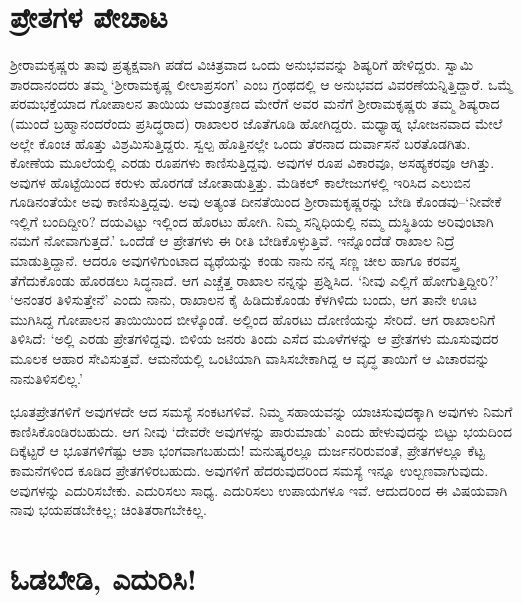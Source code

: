 \section*{ಪ್ರೇತಗಳ ಪೇಚಾಟ}


ಶ‍್ರೀರಾಮಕೃಷ್ಣರು ತಾವು ಪ್ರತ್ಯಕ್ಷವಾಗಿ ಪಡೆದ ವಿಚಿತ್ರವಾದ ಒಂದು ಅನುಭವವನ್ನು ಶಿಷ್ಯರಿಗೆ ಹೇಳಿದ್ದರು. ಸ್ವಾಮಿ ಶಾರದಾನಂದರು ತಮ್ಮ ‘ಶ‍್ರೀರಾಮಕೃಷ್ಣ ಲೀಲಾಪ್ರಸಂಗ’ ಎಂಬ ಗ್ರಂಥದಲ್ಲಿ ಆ ಅನುಭವದ ವಿವರಣೆಯನ್ನಿತ್ತಿದ್ದಾರೆ. ಒಮ್ಮೆ ಪರಮಭಕ್ತೆಯಾದ ಗೋಪಾಲನ ತಾಯಿಯ ಆಮಂತ್ರಣದ ಮೇರೆಗೆ ಅವರ ಮನೆಗೆ ಶ‍್ರೀರಾಮಕೃಷ್ಣರು ತಮ್ಮ ಶಿಷ್ಯರಾದ (ಮುಂದೆ ಬ್ರಹ್ಮಾನಂದರೆಂದು ಪ್ರಸಿದ್ಧರಾದ) ರಾಖಾಲರ ಜೊತೆಗೂಡಿ ಹೋಗಿದ್ದರು. ಮಧ್ಯಾಹ್ನ ಭೋಜನವಾದ ಮೇಲೆ ಅಲ್ಲೇ ಕೊಂಚ ಹೊತ್ತು ವಿಶ್ರಮಿಸುತ್ತಿದ್ದರು. ಸ್ವಲ್ಪ ಹೊತ್ತಿನಲ್ಲೇ ಒಂದು ತೆರನಾದ ದುರ್ವಾಸನೆ ಬರತೊಡಗಿತು. ಕೋಣೆಯ ಮೂಲೆಯಲ್ಲಿ ಎರಡು ರೂಪಗಳು ಕಾಣಿಸುತ್ತಿದ್ದವು. ಅವುಗಳ ರೂಪ ವಿಕಾರವೂ, ಅಸಹ್ಯಕರವೂ ಆಗಿತ್ತು. ಅವುಗಳ ಹೊಟ್ಟೆಯಿಂದ ಕರುಳು ಹೊರಗಡೆ ಜೋತಾಡುತ್ತಿತ್ತು. ಮೆಡಿಕಲ್ ಕಾಲೇಜುಗಳಲ್ಲಿ ಇರಿಸಿದ ಎಲುಬಿನ ಗೂಡಿನಂತೆಯೇ ಅವು ಕಾಣಿಸುತ್ತಿದ್ದವು. ಅವು ಅತ್ಯಂತ ದೀನತೆಯಿಂದ ಶ‍್ರೀರಾಮಕೃಷ್ಣರನ್ನು ಬೇಡಿ ಕೊಂಡವು–‘ನೀವೇಕೆ ಇಲ್ಲಿಗೆ ಬಂದಿದ್ದೀರಿ? ದಯವಿಟ್ಟು ಇಲ್ಲಿಂದ ಹೊರಟು ಹೋಗಿ. ನಿಮ್ಮ ಸನ್ನಿಧಿಯಲ್ಲಿ ನಮ್ಮ ದುಸ್ಥಿತಿಯ ಅರಿವುಂಟಾಗಿ ನಮಗೆ ನೋವಾಗುತ್ತದೆ.’ ಒಂದೆಡೆ ಆ ಪ್ರೇತಗಳು ಈ ರೀತಿ ಬೇಡಿಕೊಳ್ಳುತ್ತಿವೆ. ಇನ್ನೊಂದೆಡೆ ರಾಖಾಲ ನಿದ್ರೆ ಮಾಡುತ್ತಿದ್ದಾನೆ. ಆದರೂ ಅವುಗಳಿಗುಂಟಾದ ವ್ಯಥೆಯನ್ನು ಕಂಡು ನಾನು ನನ್ನ ಸಣ್ಣ ಚೀಲ ಹಾಗೂ ಕರವಸ್ತ್ರ ತೆಗೆದುಕೊಂಡು ಹೊರಡಲು ಸಿದ್ಧನಾದೆ. ಆಗ ಎಚ್ಚೆತ್ತ ರಾಖಾಲ ನನ್ನನ್ನು ಪ್ರಶ್ನಿಸಿದ. ‘ನೀವು ಎಲ್ಲಿಗೆ ಹೋಗುತ್ತಿದ್ದೀರಿ?’ ‘ಅನಂತರ ತಿಳಿಸುತ್ತೇನೆ’ ಎಂದು ನಾನು, ರಾಖಾಲನ ಕೈ ಹಿಡಿದುಕೊಂಡು ಕೆಳಗಿಳಿದು ಬಂದು, ಆಗ ತಾನೇ ಊಟ ಮುಗಿಸಿದ್ದ ಗೋಪಾಲನ ತಾಯಿಯಿಂದ ಬೀಳ್ಕೊಂಡೆ. ಅಲ್ಲಿಂದ ಹೊರಟು ದೋಣಿಯನ್ನು ಸೇರಿದೆ. ಆಗ ರಾಖಾಲನಿಗೆ ತಿಳಿಸಿದೆ: ‘ಅಲ್ಲಿ ಎರಡು ಪ್ರೇತಗಳಿದ್ದವು. ಬಿಳಿಯ ಜನರು ತಿಂದು ಎಸೆದ ಮೂಳೆಗಳನ್ನು ಆ ಪ್ರೇತಗಳು ಮೂಸುವುದರ ಮೂಲಕ ಆಹಾರ ಸೇವಿಸುತ್ತವೆ. ಆ\break ಮನೆಯಲ್ಲಿ ಒಂಟಿಯಾಗಿ ವಾಸಿಸಬೇಕಾಗಿದ್ದ ಆ ವೃದ್ಧ ತಾಯಿಗೆ ಆ ವಿಚಾರವನ್ನು ನಾನು\break ತಿಳಿಸಲಿಲ್ಲ.’

ಭೂತಪ್ರೇತಗಳಿಗೆ ಅವುಗಳದೇ ಆದ ಸಮಸ್ಯೆ ಸಂಕಟಗಳಿವೆ. ನಿಮ್ಮ ಸಹಾಯವನ್ನು ಯಾಚಿ\-ಸುವು\-ದಕ್ಕಾಗಿ ಅವುಗಳು ನಿಮಗೆ ಕಾಣಿಸಿಕೊಂಡಿರಬಹುದು. ಆಗ ನೀವು ‘ದೇವರೇ ಅವುಗಳನ್ನು ಪಾರುಮಾಡು’ ಎಂದು ಹೇಳುವುದನ್ನು ಬಿಟ್ಟು ಭಯದಿಂದ ದಿಕ್ಕೆಟ್ಟರೆ ಆ ಭೂತಗಳಿಗೆಷ್ಟು ಆಶಾ ಭಂಗವಾಗಬಹುದು! ಮನುಷ್ಯರಲ್ಲೂ ದುರ್ಜನರಿರುವಂತೆ, ಪ್ರೇತಗಳಲ್ಲೂ ಕೆಟ್ಟ ಕಾಮನೆಗಳಿಂದ ಕೂಡಿದ ಪ್ರೇತಗಳಿರಬಹುದು. ಅವುಗಳಿಗೆ ಹೆದರುವುದರಿಂದ ಸಮಸ್ಯೆ ಇನ್ನೂ ಉಲ್ಬಣವಾಗುವುದು. ಅವುಗಳನ್ನು ಎದುರಿಸಬೇಕು. ಎದುರಿಸಲು ಸಾಧ್ಯ. ಎದುರಿಸಲು ಉಪಾಯಗಳೂ ಇವೆ. ಆದುದರಿಂದ ಈ ವಿಷಯವಾಗಿ ನಾವು ಭಯಪಡಬೇಕಿಲ್ಲ; ಚಿಂತಿತರಾಗಬೇಕಿಲ್ಲ.


\section*{ಓಡಬೇಡಿ, ಎದುರಿಸಿ!}

\vskip -6pt

